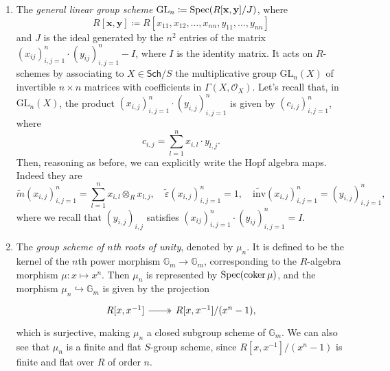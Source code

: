 \begin{ex}
\begin{enumerate}
		\item The \emph{general linear group scheme} $\mathrm{GL}_n \coloneqq 
			\operatorname{Spec}(R[\mathbf{x},\mathbf{y}]/J)$,
			where
			\begin{equation*}
				R[\mathbf{x},\mathbf{y}] \coloneqq
				R[x_{11}, x_{12}, \ldots, x_{nn},
				y_{11}, \ldots, y_{nn}]
			\end{equation*} 
			and $J$ is the ideal generated by the $n^2$ entries of the matrix
			$\left( x_{ij} \right)_{i,j=1}^n \cdot \left( y_{ij} \right)_{i,j=1}^n - I$,
			where $I$ is the identity matrix.
			It acts on $R$-schemes by associating to
			$X \in \mathsf{Sch}/S$ the multiplicative group
			$\mathrm{GL}_n(X)$ of invertible $n \times n$
			matrices with coefficients in $\Gamma \left( X , \mathcal{O}_{ X } \right)$.
			Let's recall that, in $\mathrm{GL}_n(X)$, the product
			$\left( x_{i,j} \right)_{i,j = 1}^n \cdot 
			\left( y_{i,j} \right)_{i,j = 1}^n$
			is given by $\left( c_{i,j} \right)_{i,j = 1}^n$, where
			\begin{equation*}
			c_{i,j} = \sum_{l=1}^{n} x_{i,l} \cdot y_{l,j}
			.\end{equation*} 
			Then, reasoning as before, we can explicitly write the Hopf algebra maps.
			Indeed they are
			\begin{equation*}
				\widetilde{m}(x_{i,j})_{i,j=1}^n = \sum_{l=1}^{n} x_{i,l} \otimes_R x_{l,j},
				\quad
				\widetilde{\varepsilon}(x_{i,j})_{i,j=1}^n = 1,
				\quad
				\widetilde{\mathrm{inv}}(x_{i,j})_{i,j=1}^n = (y_{i,j})_{i,j=1}^n
			,\end{equation*} 
			where we recall that $\left( y_{i,j} \right)_{i,j}$ satisfies 
			$\left( x_{ij} \right)_{i,j=1}^n \cdot \left( y_{ij} \right)_{i,j=1}^n = I$.


		\item The \emph{group scheme of $n$th roots of unity}, denoted by $\mu_n$.
			It is defined to be the kernel of the $n$th power morphism
			$\mathbb{G}_m \to \mathbb{G}_m$,
			corresponding to the $R$-algebra morphism
			$\mu\colon x \mapsto x^n$.
			Then $\mu_n$ is represented by $\operatorname{Spec}(\operatorname{coker} \mu)$,
			and the morphism $\mu_n \hookrightarrow \mathbb{G}_m$ is given by the projection
			\begin{equation*}
			\begin{tikzcd}
				R[x,x^{-1}] \arrow[r, "", twoheadrightarrow] &
				R[x,x^{-1}] / (x^n - 1)
			,\end{tikzcd}
			\end{equation*}
			which is surjective, making $\mu_n$
			a closed subgroup scheme of $\mathbb{G}_m$.
			We can also see that 
			$\mu_n$ is a finite and flat $S$-group scheme, 
			since $R[x,x^{-1}] / (x^n-1)$ is finite and flat over $R$
			of order \(n\).



\end{enumerate}
\end{ex}

